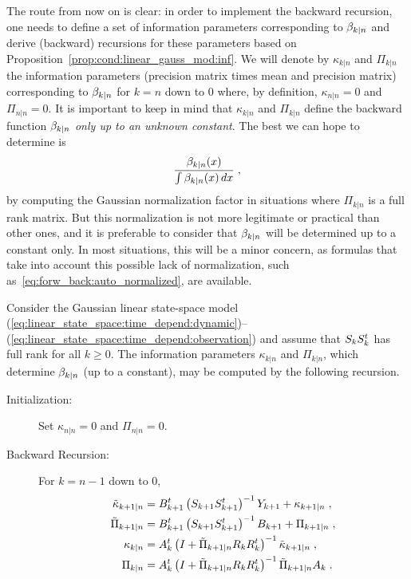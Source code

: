 The route from now on is clear: in order to implement the backward recursion,
one needs to define a set of information parameters corresponding to
$\beta_{k|n}$ and derive (backward) recursions for these parameters based on
Proposition~\ref{prop:cond:linear_gauss_mod:inf}. We will denote by
$\kappa_{k|n}$ and $\Pi_{k|n}$ the information parameters (precision matrix
times mean and precision matrix) corresponding to $\beta_{k|n}$ for $k=n$
down to $0$ where, by definition, $\kappa_{n|n} = 0$ and $\Pi_{n|n} = 0$. It
is important to keep in mind that $\kappa_{k|n}$ and $\Pi_{k|n}$ define the
backward function $\beta_{k|n}$ {\em only up to an unknown constant}. The
best we can hope to determine is
\[
  \frac{\beta_{k|n}(x)}{\int \beta_{k|n}(x)\, dx} \; ,
\]
by computing the Gaussian normalization factor in situations where $\Pi_{k|n}$
is a full rank matrix. But this normalization is not more legitimate or
practical than other ones, and it is preferable to consider that $\beta_{k|n}$
will be determined up to a constant only. In most situations, this will be a
minor concern, as formulas that take into account this possible lack of
normalization, such as~\eqref{eq:forw_back:auto_normalized}, are available.

\begin{prop}
\label{prop:backwd:info:recursion}
Consider the Gaussian linear state-space model
(\ref{eq:linear_state_space:time_depend:dynamic})--(\ref{eq:linear_state_space:time_depend:observation})
and assume that $\VCov[k]$ has full rank for all $k \geq 0$.  The
information parameters $\kappa_{k|n}$ and $\Pi_{k|n}$, which determine
$\beta_{k|n}$ (up to a constant), may be computed by the following recursion.
  \begin{description}
  \item[Initialization:] Set $\kappa_{n|n} = 0$ and $\Pi_{n|n} = 0$.
  \smallskip
  \item[Backward Recursion:] For $k = n-1$ down to 0,
    \begin{align}
      \label{eq:bck-inf:obs:mean}
      \tilde{\kappa}_{k+1|n} & = B_{k+1}^t \left(S_{k+1}S_{k+1}^t\right)^{-1} Y_{k+1} + \kappa_{k+1|n} \; ,  \\
      \label{eq:bck-inf:obs:cov}
      \tilde{\Pi}_{k+1|n} & = B_{k+1}^t \left(S_{k+1}S_{k+1}^t\right)^{-1}B_{k+1} + \Pi_{k+1|n} \; , \\
      \label{eq:bck-inf:update:mean}
      \kappa_{k|n} & = A_k^t \left(I + \tilde{\Pi}_{k+1|n} R_{k}R_{k}^t\right)^{-1} \tilde{\kappa}_{k+1|n} \; , \\
      \label{eq:bck-inf:update:cov}
      \Pi_{k|n} & = A_k^t \left(I + \tilde{\Pi}_{k+1|n} R_{k}R_{k}^t\right)^{-1} \tilde{\Pi}_{k+1|n} A_k \; .
    \end{align}
  \end{description}
\end{prop}

